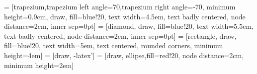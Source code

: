\usepackage[utf8]{inputenx}
\usepackage[spanish]{babel}
\usepackage{amsmath}
\usepackage{amsthm}
\usepackage{amssymb}
\usepackage{amsfonts}   
\usepackage{pifont}     %
\usepackage{graphicx}
\usepackage{epsfig}
\usepackage{pdflscape}
\usepackage{enumerate}
\usepackage{color}
\usepackage{beamerfoils}
\usepackage{beamerprosper}
\usepackage{xspace}
\usepackage{booktabs}
\usepackage{multicol}
\usepackage{multirow}
\usepackage{tikz}
\usepackage{pgflibraryshapes}
\usepackage{wasysym}
\usepackage{float}
\usepackage{listings}

\usetikzlibrary{arrows}



 = [trapezium,trapezium left angle=70,trapezium right angle=-70,
  minimum height=0.9cm, draw, fill=blue!20, text width=4.5em, 
  text badly centered, node distance=2cm, inner sep=0pt]
 = [diamond, draw, fill=blue!20, text width=5.5em, 
  text badly centered, node distance=2cm, inner sep=0pt]
 = [rectangle, draw, fill=blue!20, text width=5em, 
  text centered, rounded corners, minimum height=4em]
 = [draw, -latex']
 = [draw, ellipse,fill=red!20, node distance=2cm, 
    minimum height=2em]






